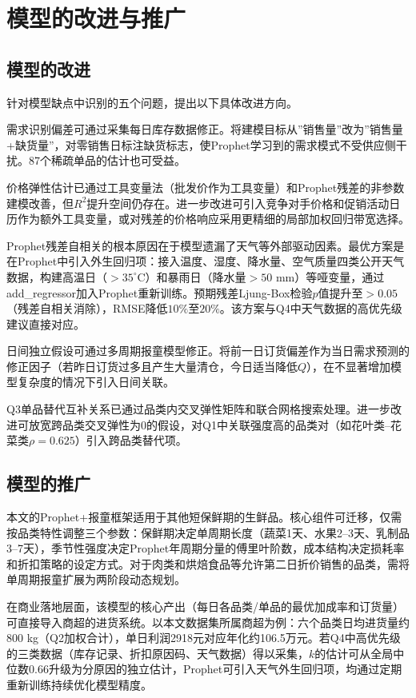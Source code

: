 
\section{模型的改进与推广}

\subsection{模型的改进}

针对模型缺点中识别的五个问题，提出以下具体改进方向。

需求识别偏差可通过采集每日库存数据修正。将建模目标从”销售量”改为”销售量+缺货量”，对零销售日标注缺货标志，使Prophet学习到的需求模式不受供应侧干扰。87个稀疏单品的估计也可受益。

价格弹性估计已通过工具变量法（批发价作为工具变量）和Prophet残差的非参数建模改善，但$R^2$提升空间仍存在。进一步改进可引入竞争对手价格和促销活动日历作为额外工具变量，或对残差的价格响应采用更精细的局部加权回归带宽选择。

Prophet残差自相关的根本原因在于模型遗漏了天气等外部驱动因素。最优方案是在Prophet中引入外生回归项：接入温度、湿度、降水量、空气质量四类公开天气数据，构建高温日（$>35^{\circ}$C）和暴雨日（降水量$>50$ mm）等哑变量，通过add\_regressor加入Prophet重新训练。预期残差Ljung-Box检验$p$值提升至$>0.05$（残差自相关消除），RMSE降低$10\%$至$20\%$。该方案与Q4中天气数据的高优先级建议直接对应。

日间独立假设可通过多周期报童模型修正。将前一日订货偏差作为当日需求预测的修正因子（若昨日订货过多且产生大量清仓，今日适当降低$Q$），在不显著增加模型复杂度的情况下引入日间关联。

Q3单品替代互补关系已通过品类内交叉弹性矩阵和联合网格搜索处理。进一步改进可放宽跨品类交叉弹性为0的假设，对Q1中关联强度高的品类对（如花叶类--花菜类$\rho=0.625$）引入跨品类替代项。

\subsection{模型的推广}

本文的Prophet+报童框架适用于其他短保鲜期的生鲜品。核心组件可迁移，仅需按品类特性调整三个参数：保鲜期决定单周期长度（蔬菜1天、水果2--3天、乳制品3--7天），季节性强度决定Prophet年周期分量的傅里叶阶数，成本结构决定损耗率和折扣策略的设定方式。对于肉类和烘焙食品等允许第二日折价销售的品类，需将单周期报童扩展为两阶段动态规划。

在商业落地层面，该模型的核心产出（每日各品类/单品的最优加成率和订货量）可直接导入商超的进货系统。以本文数据集所属商超为例：六个品类日均进货量约800 kg（Q2加权合计），单日利润2918元对应年化约106.5万元。若Q4中高优先级的三类数据（库存记录、折扣原因码、天气数据）得以采集，$k$的估计可从全局中位数$0.66$升级为分原因的独立估计，Prophet可引入天气外生回归项，均通过定期重新训练持续优化模型精度。
